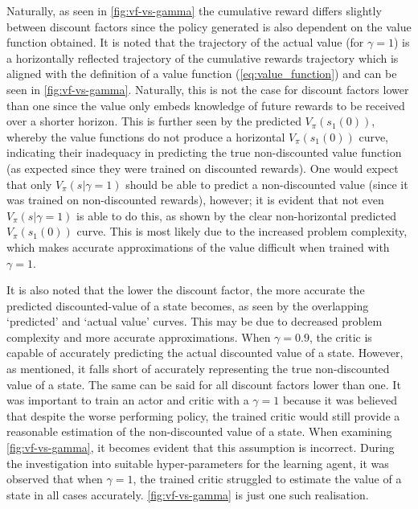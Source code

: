  Naturally, as seen in \autoref{fig:vf-vs-gamma} the cumulative reward differs slightly between discount factors since the policy generated is also dependent on the value function obtained. It is noted that the trajectory of the actual value (for $\gamma = 1$) is a horizontally reflected trajectory of the cumulative rewards trajectory which is aligned with the definition of a value function (\autoref{eq:value_function}) and can be seen in \autoref{fig:vf-vs-gamma}. Naturally, this is not the case for discount factors lower than one since the value only embeds knowledge of future rewards to be received over a shorter horizon. This is further seen by the predicted $V_{\pi}(s_1(0))$, whereby the value functions do not produce a horizontal $V_{\pi}(s_1(0))$ curve, indicating their inadequacy in predicting the true non-discounted value function (as expected since they were trained on discounted rewards). One would expect that only $V_{\pi}(s|\gamma = 1)$ should be able to predict a non-discounted value (since it was trained on non-discounted rewards), however; it is evident that not even $V_{\pi}(s|\gamma = 1)$ is able to do this, as shown by the clear non-horizontal predicted $V_{\pi}(s_1(0))$ curve. This is most likely due to the increased problem complexity, which makes accurate approximations of the value difficult when trained with $\gamma = 1$.
 
It is also noted that the lower the discount factor, the more accurate the predicted discounted-value of a state becomes, as seen by the overlapping ‘predicted’ and ‘actual value’ curves. This may be due to decreased problem complexity and more accurate approximations. When $\gamma = 0.9$, the critic is capable of accurately predicting the actual discounted value of a state. However, as mentioned, it falls short of accurately representing the true non-discounted value of a state. The same can be said for all discount factors lower than one. It was important to train an actor and critic with a $\gamma = 1$ because it was believed that despite the worse performing policy, the trained critic would still provide a reasonable estimation of the non-discounted value of a state. When examining \autoref{fig:vf-vs-gamma}, it becomes evident that this assumption is incorrect. During the investigation into suitable hyper-parameters for the learning agent, it was observed that when $\gamma = 1$, the trained critic struggled to estimate the value of a state in all cases accurately. \autoref{fig:vf-vs-gamma} is just one such realisation.

